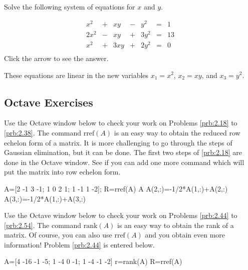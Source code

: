 \documentclass{ximera}
\begin{document}
\begin{problem}\label{prb:quadratic}
Solve the following system of equations for $x$ and $y$.

\begin{equation*}
\begin{array}{rlrlrcr}
	  x^2 & + &   xy & - &   y^2 & = &  1 \\
	 2x^2 & - &   xy & + &  3y^2 & = & 13 \\
	  x^2 & + &  3xy & + &  2y^2 & = &  0 \\
\end{array}
\end{equation*}
Click the arrow to see the answer. 
\begin{expandable}
These equations are linear in the new variables $x_{1} = x^{2}$, $x_{2} = xy$, and $x_{3} = y^{2}$.
\end{expandable}
\end{problem}


\subsection*{Octave Exercises}
\begin{problem}\label{oct:rref}
Use the Octave window below to check your work on Problems \ref{prb:2.18} to \ref{prb:2.38}.  The command $\mbox{rref}(A)$ is an easy way to obtain the reduced row echelon form of a matrix.  It is more challenging to go through the steps of Gaussian elimination, but it can be done.  The first two steps of \ref{prb:2.18} are done in the Octave window.  See if you can add one more command which will put the matrix into row echelon form.

A=[2 -1 3 -1; 1 0 2 1; 1 -1 1 -2];
R=rref(A)
A
A(2,:)=-1/2*A(1,:)+A(2,:)
A(3,:)=-1/2*A(1,:)+A(3,:)
\end{problem}

\begin{problem}\label{oct:rank}
Use the Octave window below to check your work on Problems \ref{prb:2.44} to \ref{prb:2.54}.  The command $\mbox{rank}(A)$ is an easy way to obtain the rank of a matrix.  Of course, you can also use $\mbox{rref}(A)$ and you obtain even more information!  Problem \ref{prb:2.44} is entered below.

A=[4 -16 -1 -5; 1 -4 0 -1; 1 -4 -1 -2]
r=rank(A)
R=rref(A)
\end{problem}
\end{document}
